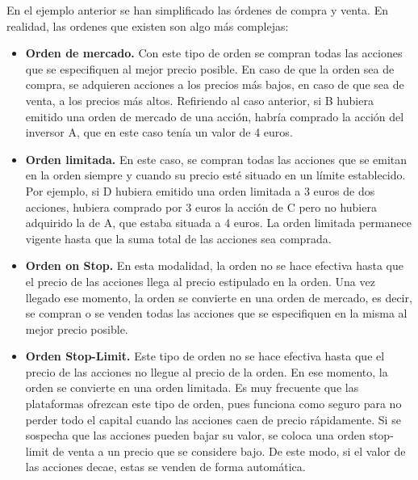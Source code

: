 En el ejemplo anterior se han simplificado las \'ordenes de compra y venta. En realidad, las ordenes que existen son algo m\'as complejas:\\

\begin{itemize}
	
	\item \textbf{Orden de mercado.} Con este tipo de orden se compran todas las acciones que se especifiquen al mejor precio posible. En caso de que la orden sea de compra, se adquieren acciones a los precios m\'as bajos, en caso de que sea de venta, a los precios m\'as altos. Refiriendo al caso anterior, si B hubiera emitido una orden de mercado de una acci\'on, habría comprado la acci\'on del inversor A, que en este caso ten\'ia un valor de 4 euros.
	
	\item \textbf{Orden limitada.} En este caso, se compran todas las acciones que se emitan en la orden siempre y cuando su precio est\'e situado en un l\'imite establecido. Por ejemplo, si D hubiera emitido una orden limitada a 3 euros de dos acciones, hubiera comprado por 3 euros la acci\'on de C pero no hubiera adquirido la de A, que estaba situada a 4 euros. La orden limitada permanece vigente hasta que la suma total de las acciones sea comprada.
	
	\item \textbf{Orden on Stop.} En esta modalidad, la orden no se hace efectiva hasta que el precio de las acciones llega al precio estipulado en la orden. Una vez llegado ese momento, la orden se convierte en una orden de mercado, es decir, se compran o se venden todas las acciones que se especifiquen en la misma al mejor precio posible.
	
	\item \textbf{Orden Stop-Limit.} Este tipo de orden no se hace efectiva hasta que el precio de las acciones no llegue al precio de la orden. En ese momento, la orden se convierte en una orden limitada. Es muy frecuente que las plataformas ofrezcan este tipo de orden, pues funciona como seguro para no perder todo el capital cuando las acciones caen de precio r\'apidamente. Si se sospecha que las acciones pueden bajar su valor, se coloca una orden stop-limit de venta a un precio que se considere bajo. De este modo, si el valor de las acciones decae, estas se venden de forma autom\'atica. 
	
\end{itemize} 

		
		
